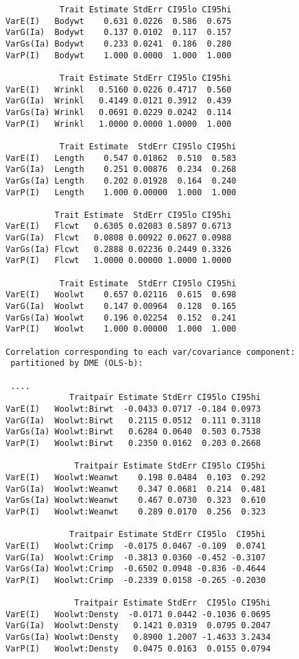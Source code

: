 \documentclass[titlepage]{article}  %
\begin{document}
\begin{verbatim}
           Trait Estimate StdErr CI95lo CI95hi
VarE(I)   Bodywt    0.631 0.0226  0.586  0.675
VarG(Ia)  Bodywt    0.137 0.0102  0.117  0.157
VarGs(Ia) Bodywt    0.233 0.0241  0.186  0.280
VarP(I)   Bodywt    1.000 0.0000  1.000  1.000

           Trait Estimate StdErr CI95lo CI95hi
VarE(I)   Wrinkl   0.5160 0.0226 0.4717  0.560
VarG(Ia)  Wrinkl   0.4149 0.0121 0.3912  0.439
VarGs(Ia) Wrinkl   0.0691 0.0229 0.0242  0.114
VarP(I)   Wrinkl   1.0000 0.0000 1.0000  1.000

           Trait Estimate  StdErr CI95lo CI95hi
VarE(I)   Length    0.547 0.01862  0.510  0.583
VarG(Ia)  Length    0.251 0.00876  0.234  0.268
VarGs(Ia) Length    0.202 0.01928  0.164  0.240
VarP(I)   Length    1.000 0.00000  1.000  1.000

          Trait Estimate  StdErr CI95lo CI95hi
VarE(I)   Flcwt   0.6305 0.02083 0.5897 0.6713
VarG(Ia)  Flcwt   0.0808 0.00922 0.0627 0.0988
VarGs(Ia) Flcwt   0.2888 0.02236 0.2449 0.3326
VarP(I)   Flcwt   1.0000 0.00000 1.0000 1.0000

           Trait Estimate  StdErr CI95lo CI95hi
VarE(I)   Woolwt    0.657 0.02116  0.615  0.698
VarG(Ia)  Woolwt    0.147 0.00964  0.128  0.165
VarGs(Ia) Woolwt    0.196 0.02254  0.152  0.241
VarP(I)   Woolwt    1.000 0.00000  1.000  1.000

Correlation corresponding to each var/covariance component:
 partitioned by DME (OLS-b):

 ....
             Traitpair Estimate StdErr CI95lo CI95hi
VarE(I)   Woolwt:Birwt  -0.0433 0.0717 -0.184 0.0973
VarG(Ia)  Woolwt:Birwt   0.2115 0.0512  0.111 0.3118
VarGs(Ia) Woolwt:Birwt   0.6284 0.0640  0.503 0.7538
VarP(I)   Woolwt:Birwt   0.2350 0.0162  0.203 0.2668

              Traitpair Estimate StdErr CI95lo CI95hi
VarE(I)   Woolwt:Weanwt    0.198 0.0484  0.103  0.292
VarG(Ia)  Woolwt:Weanwt    0.347 0.0681  0.214  0.481
VarGs(Ia) Woolwt:Weanwt    0.467 0.0730  0.323  0.610
VarP(I)   Woolwt:Weanwt    0.289 0.0170  0.256  0.323

             Traitpair Estimate StdErr CI95lo  CI95hi
VarE(I)   Woolwt:Crimp  -0.0175 0.0467 -0.109  0.0741
VarG(Ia)  Woolwt:Crimp  -0.3813 0.0360 -0.452 -0.3107
VarGs(Ia) Woolwt:Crimp  -0.6502 0.0948 -0.836 -0.4644
VarP(I)   Woolwt:Crimp  -0.2339 0.0158 -0.265 -0.2030

              Traitpair Estimate StdErr  CI95lo CI95hi
VarE(I)   Woolwt:Densty  -0.0171 0.0442 -0.1036 0.0695
VarG(Ia)  Woolwt:Densty   0.1421 0.0319  0.0795 0.2047
VarGs(Ia) Woolwt:Densty   0.8900 1.2007 -1.4633 3.2434
VarP(I)   Woolwt:Densty   0.0475 0.0163  0.0155 0.0794


\end{verbatim}
\end{document}
